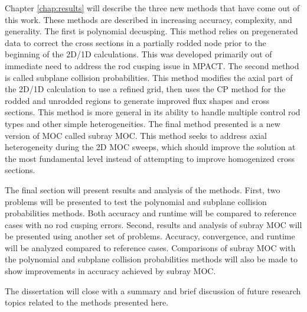 Chapter \ref{chap:results} will describe the three new methods that have come out of this work.  These methods are described in increasing accuracy, complexity, and generality.  The first is polynomial decusping.  This method relies on pregenerated data to correct the cross sections in a partially rodded node prior to the beginning of the 2D/1D calculations.  This was developed primarily out of immediate need to address the rod cusping issue in MPACT.  The second method is called subplane collision probabilities.  This method modifies the axial part of the 2D/1D calculation to use a refined grid, then uses the CP method for the rodded and unrodded regions to generate improved flux shapes and cross sections.  This method is more general in its ability to handle multiple control rod types and other simple heterogeneities.  The final method presented is a new version of MOC called subray MOC.  This method seeks to address axial heterogeneity during the 2D MOC sweeps, which should improve the solution at the most fundamental level instead of attempting to improve homogenized cross sections.

The final section will present results and analysis of the methods.  First, two problems will be presented to test the polynomial and subplane collision probabilities methods.  Both accuracy and runtime will be compared to reference cases with no rod cusping errors.  Second, results and analysis of subray MOC will be presented using another set of problems.  Accuracy, convergence, and runtime will be analyzed compared to reference cases.  Comparisons of subray MOC with the polynomial and subplane collision probabilities methods will also be made to show improvements in accuracy achieved by subray MOC.

The dissertation will close with a summary and brief discussion of future research topics related to the methods presented here.